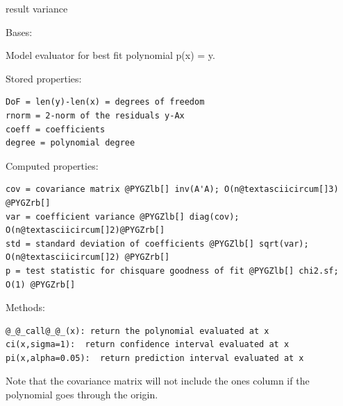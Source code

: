 \documentclass[letterpaper,10pt,english]{sphinxmanual}
\begin{document}
\begin{fulllineitems}
\begin{fulllineitems}
\end{fulllineitems}


\begin{fulllineitems}
\label{api/wsolve:refl1d.wsolve.LinearModel.var}
result variance

\end{fulllineitems}


\end{fulllineitems}


\begin{fulllineitems}
\label{api/wsolve:refl1d.wsolve.PolynomialModel}
Bases: 

Model evaluator for best fit polynomial p(x) = y.

Stored properties:

\begin{Verbatim}[commandchars=@\[\]]
DoF = len(y)-len(x) = degrees of freedom
rnorm = 2-norm of the residuals y-Ax
coeff = coefficients
degree = polynomial degree
\end{Verbatim}

Computed properties:

\begin{Verbatim}[commandchars=@\[\]]
cov = covariance matrix @PYGZlb[] inv(A'A); O(n@textasciicircum[]3) @PYGZrb[]
var = coefficient variance @PYGZlb[] diag(cov); O(n@textasciicircum[]2)@PYGZrb[]
std = standard deviation of coefficients @PYGZlb[] sqrt(var); O(n@textasciicircum[]2) @PYGZrb[]
p = test statistic for chisquare goodness of fit @PYGZlb[] chi2.sf; O(1) @PYGZrb[]
\end{Verbatim}

Methods:

\begin{Verbatim}[commandchars=@\[\]]
@_@_call@_@_(x): return the polynomial evaluated at x
ci(x,sigma=1):  return confidence interval evaluated at x
pi(x,alpha=0.05):  return prediction interval evaluated at x
\end{Verbatim}

Note that the covariance matrix will not include the ones column if
the polynomial goes through the origin.


\end{fulllineitems}
\end{document}
